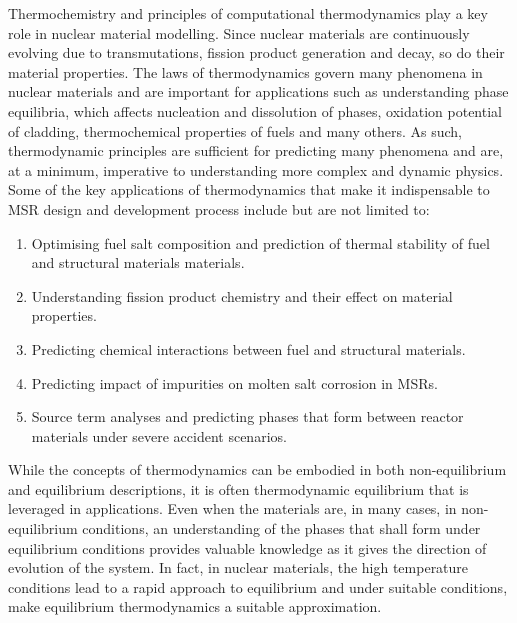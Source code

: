     Thermochemistry and principles of computational thermodynamics play a key role in nuclear material modelling. Since nuclear materials are continuously evolving due to transmutations, fission product generation and decay, so do their material properties. The laws of thermodynamics govern many phenomena in nuclear materials and are important for applications such as understanding phase equilibria, which affects nucleation and dissolution of phases, oxidation potential of cladding, thermochemical properties of fuels and many others. As such, thermodynamic principles are sufficient for predicting many phenomena and are, at a minimum, imperative to understanding more complex and dynamic physics. Some of the key applications of thermodynamics that make it indispensable to MSR design and development process include but are not limited to:
    \begin{enumerate}
        \item Optimising fuel salt composition and prediction of thermal stability of fuel and structural materials materials.
	\item Understanding fission product chemistry and their effect on material properties.
	\item Predicting chemical interactions between fuel and structural materials.
	\item Predicting impact of impurities on molten salt corrosion in MSRs.
        \item Source term analyses and predicting phases that form between reactor materials under severe accident scenarios.
    \end{enumerate}
	
	While the concepts of thermodynamics can be embodied in both non-equilibrium and equilibrium descriptions, it is often thermodynamic equilibrium that is leveraged in applications. Even when the materials are, in many cases, in non-equilibrium conditions, an understanding of the phases that shall form under equilibrium conditions provides valuable knowledge as it gives the direction of evolution of the system.  In fact, in nuclear materials, the high temperature conditions lead to a rapid approach to equilibrium and under suitable conditions, make equilibrium thermodynamics a suitable approximation.
	
